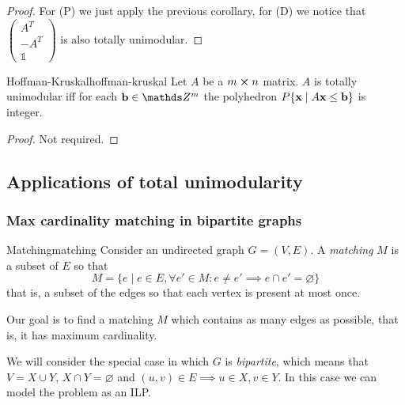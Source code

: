 \documentclass[12pt]{extarticle}
\renewcommand{\vec}[1]{\bvec{#1}}
\begin{document}
\begin{proof}
	For (P) we just apply the previous corollary, for (D) we notice that
	$\begin{pmatrix} A^T \\ -A^T \\ \mathds 1 \end{pmatrix}$ is also totally unimodular.
\end{proof}

\begin{theorem}{Hoffman-Kruskal}{hoffman-kruskal}
	Let $A$ be a $m \cross n$ matrix. $A$ is totally unimodular iff for each $\vec b \in \Z^m$ the
	polyhedron $P \{ \vec x \mid A \vec x \leq \vec b \}$ is integer.
\end{theorem}

\begin{proof} Not required. \end{proof}

\subsection{Applications of total unimodularity}

\subsubsection{Max cardinality matching in bipartite graphs}

\begin{definition}{Matching}{matching}
	Consider an undirected graph $G = (V, E)$.
	A \emph{matching} $M$ is a subset of $E$ so that
	\begin{equation}
		M = \{ e \mid e \in E, \forall e' \in M : e \neq e' \implies e \cap e' = \varnothing \}
	\end{equation}
	that is, a subset of the edges so that each vertex is present at most once.
\end{definition}

Our goal is to find a matching $M$ which contains as many edges as possible, that is, it has maximum
cardinality.

We will consider the special case in which $G$ is \emph{bipartite}, which means that $V = X \cup Y$,
$X \cap Y = \varnothing$ and $(u, v) \in E \implies u \in X, v \in Y$.
In this case we can model the problem as an ILP.
\end{document}
